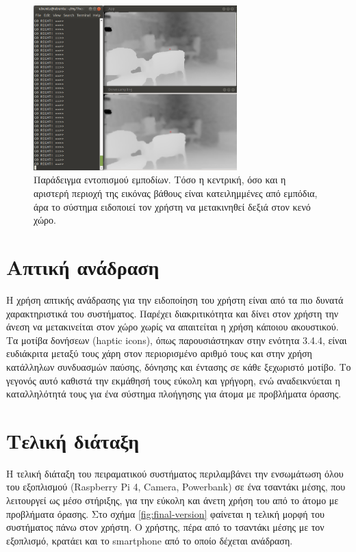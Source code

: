 \begin{figure}[H]
    \centering
    \includegraphics[width=0.7\textwidth]{images/test_depth_right.png}
    \caption{Παράδειγμα εντοπισμού εμποδίων. Τόσο η κεντρική, όσο και η αριστερή περιοχή της εικόνας βάθους είναι κατειλημμένες από εμπόδια, άρα το σύστημα ειδοποιεί τον χρήστη να μετακινηθεί δεξιά στον κενό χώρο.}
    \label{fig:test-depth-right}
\end{figure}

\section{Απτική ανάδραση}
Η χρήση απτικής ανάδρασης για την ειδοποίηση του χρήστη είναι από τα πιο δυνατά χαρακτηριστικά του συστήματος. Παρέχει διακριτικότητα και δίνει στον χρήστη την άνεση να μετακινείται στον χώρο χωρίς να απαιτείται η χρήση κάποιου ακουστικού. Τα μοτίβα δονήσεων (haptic icons), όπως παρουσιάστηκαν στην ενότητα 3.4.4, είναι ευδιάκριτα μεταξύ τους χάρη στον περιορισμένο αριθμό τους και στην χρήση κατάλληλων συνδυασμών παύσης, δόνησης και έντασης σε κάθε ξεχωριστό μοτίβο. Το γεγονός αυτό καθιστά την εκμάθησή τους εύκολη και γρήγορη, ενώ αναδεικνύεται η καταλληλότητά τους για ένα σύστημα πλοήγησης για άτομα με προβλήματα όρασης.

\section{Τελική διάταξη}
Η τελική διάταξη του πειραματικού συστήματος περιλαμβάνει την ενσωμάτωση όλου του εξοπλισμού (Raspberry Pi 4, Camera, Powerbank) σε ένα τσαντάκι μέσης, που λειτουργεί ως μέσο στήριξης, για την εύκολη και άνετη χρήση του από το άτομο με προβλήματα όρασης. Στο σχήμα \ref{fig:final-version} φαίνεται η τελική μορφή του συστήματος πάνω στον χρήστη. Ο χρήστης, πέρα από το τσαντάκι μέσης με τον εξοπλισμό, κρατάει και το smartphone από το οποίο δέχεται ανάδραση.

